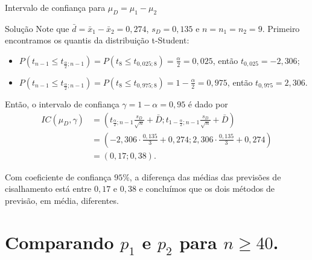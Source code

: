 \documentclass[9pt]{beamer}
\begin{document}
\begin{frame}{Intervalo de confiança para $\mu_D=\mu_1 - \mu_2$}

\small
\begin{block}{Solução}
Note que $\bar{d} = \bar{x}_1-\bar{x}_2 = 0,274$, $s_D = 0,135$ e $n=n_1=n_2=9$. Primeiro encontramos os quantis da distribuição t-Student:
\begin{itemize}
\item $P(t_{n-1} \leq t_{\frac{\alpha}{2}; n-1}) = P(t_{8} \leq t_{0,025; 8}) = \frac{\alpha}{2} = 0,025$, então $t_{0,025} =-2,306$;
\item $P(t_{n-1} \leq t_{\frac{\alpha}{2}; n-1}) = P(t_{8} \leq t_{0,975; 8}) =1- \frac{\alpha}{2} = 0,975$, então $t_{0,975} =2,306$.
\end{itemize}	

Então, o intervalo de confiança $\gamma=1-\alpha = 0,95$ é dado por
\begin{align*}
IC(\mu_D, \gamma) &= \left( t_{\frac{\alpha}{2};n-1} \frac{s_D }{\sqrt{n}}  + \bar{D}; t_{1-\frac{\alpha}{2};n-1} \frac{s_D }{\sqrt{n}}   + \bar{D}  \right)\\
&= \left( -2,306 \cdot \frac{0,135}{3} + 0,274; 2,306 \cdot \frac{0,135}{3} + 0,274 \right)\\
&= \left( 0,17; 0,38  \right).
\end{align*}

Com coeficiente de confiança $95\%$, a diferença das médias das previsões de cisalhamento está entre $0,17$ e $0,38$ e  concluímos que os dois métodos de previsão, em média, diferentes.
\end{block}
\normalsize

\end{frame}


\section{Comparando $p_1$ e $p_2$ para $n \geq 40$.}
\end{document}
